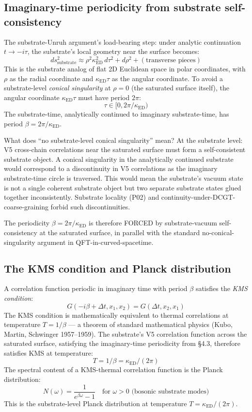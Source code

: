 \documentclass[11pt,a4paper]{article}
\begin{document}
\subsection{Imaginary-time periodicity from substrate self-consistency}

The substrate-Unruh argument's load-bearing step: under analytic continuation $t \to -i\tau$, the substrate's local geometry near the surface becomes:
\[
ds^{2}_{\mathrm{substrate}} \approx \rho^{2} \kappa_{\mathrm{ED}}^{2}\, d\tau^{2} + d\rho^{2} + (\text{transverse pieces})
\]
This is the substrate analog of flat 2D Euclidean space in polar coordinates, with $\rho$ as the radial coordinate and $\kappa_{\mathrm{ED}}\tau$ as the angular coordinate. To avoid a substrate-level \emph{conical singularity} at $\rho = 0$ (the saturated surface itself), the angular coordinate $\kappa_{\mathrm{ED}}\tau$ must have period $2\pi$:
\[
\tau \in [0, 2\pi/\kappa_{\mathrm{ED}})
\]
The substrate-time, analytically continued to imaginary substrate-time, has period $\beta = 2\pi/\kappa_{\mathrm{ED}}$.

What does ``no substrate-level conical singularity'' mean? At the substrate level: V5 cross-chain correlations near the saturated surface must form a self-consistent substrate object. A conical singularity in the analytically continued substrate would correspond to a discontinuity in V5 correlations as the imaginary substrate-time circle is traversed. This would mean the substrate's vacuum state is not a single coherent substrate object but two separate substrate states glued together inconsistently. Substrate locality (P02) and continuity-under-DCGT-coarse-graining forbid such discontinuities.

The periodicity $\beta = 2\pi/\kappa_{\mathrm{ED}}$ is therefore FORCED by substrate-vacuum self-consistency at the saturated surface, in parallel with the standard no-conical-singularity argument in QFT-in-curved-spacetime.

\subsection{The KMS condition and Planck distribution}

A correlation function periodic in imaginary time with period $\beta$ satisfies the \emph{KMS condition}:
\[
G(-i\beta + \Delta t, x_1, x_2) = G(\Delta t, x_2, x_1)
\]
The KMS condition is mathematically equivalent to thermal correlations at temperature $T = 1/\beta$ --- a theorem of standard mathematical physics (Kubo, Martin, Schwinger 1957--1959). The substrate's V5 correlation function across the saturated surface, satisfying the imaginary-time periodicity from \S4.3, therefore satisfies KMS at temperature:
\[
T = 1/\beta = \kappa_{\mathrm{ED}}/(2\pi)
\]
The spectral content of a KMS-thermal correlation function is the Planck distribution:
\[
N(\omega) = \frac{1}{e^{\beta\omega} - 1} \quad \text{for } \omega > 0 \text{ (bosonic substrate modes)}
\]
This is the substrate-level Planck distribution at temperature $T = \kappa_{\mathrm{ED}}/(2\pi)$.
\end{document}
